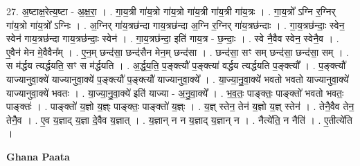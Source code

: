 \documentclass[17pt]{extarticle}
\begin{document}
27. अ॒ष्टाक्ष॒रेत्य॒ष्टा - अ॒क्ष॒रा॒ । . गा॒य॒त्री गा॑य॒त्रो गा॑य॒त्रो गा॑य॒त्री गा॑य॒त्री गा॑य॒त्रः । . गा॒य॒त्रो᳚ ऽग्नि र॒ग्निर् गा॑य॒त्रो गा॑य॒त्रो᳚ ऽग्निः । . अ॒ग्निर् गा॑य॒त्रछ॑न्दा गाय॒त्रछ॑न्दा अ॒ग्नि र॒ग्निर् गा॑य॒त्रछ॑न्दाः । . गा॒य॒त्रछ॑न्दाः॒ स्वेन॒ स्वेन॑ गाय॒त्रछ॑न्दा गाय॒त्रछ॑न्दाः॒ स्वेन॑ । . गा॒य॒त्रछ॑न्दा॒ इति॑ गाय॒त्र - छ॒न्दाः॒ । . स्वे नै॒वैव स्वेन॒ स्वेनै॒व । . ए॒वैन॑ मेन मे॒वैवैन᳚म् । . ए॒न॒म् छन्द॑सा॒ छन्द॑सैन मेन॒म् छन्द॑सा । . छन्द॑सा॒ सꣳ सम् छन्द॑सा॒ छन्द॑सा॒ सम् । . स म॑र्द्धय त्यर्द्धयति॒ सꣳ स म॑र्द्धयति । . अ॒र्द्ध॒य॒ति॒ प॒ङ्क्त्यौ॑ प॒ङ्क्त्या॑ वर्द्धय त्यर्द्धयति प॒ङ्क्त्यौ᳚ । . प॒ङ्क्त्यौ॑ याज्यानुवा॒क्ये॑ याज्यानुवा॒क्ये॑ प॒ङ्क्त्यौ॑ प॒ङ्क्त्यौ॑ याज्यानुवा॒क्ये᳚ । . या॒ज्या॒नु॒वा॒क्ये॑ भवतो भवतो याज्यानुवा॒क्ये॑ याज्यानुवा॒क्ये॑ भवतः । . या॒ज्या॒नु॒वा॒क्ये॑ इति॑ याज्या - अ॒नु॒वा॒क्ये᳚ । . भ॒व॒तः॒ पाङ्क्तः॒ पाङ्क्तो॑ भवतो भवतः॒ पाङ्क्तः॑ । . पाङ्क्तो॑ य॒ज्ञो य॒ज्ञ्ः पाङ्क्तः॒ पाङ्क्तो॑ य॒ज्ञ्ः । . य॒ज्ञ् स्तेन॒ तेन॑ य॒ज्ञो य॒ज्ञ् स्तेन॑ । . तेनै॒वैव तेन॒ तेनै॒व । . ए॒व य॒ज्ञाद् य॒ज्ञा दे॒वैव य॒ज्ञात् । . य॒ज्ञान् न न य॒ज्ञाद् य॒ज्ञान् न । . नैत्ये॑ति॒ न नैति॑ । . ए॒तीत्ये॑ति । \newline

\textbf{Ghana Paata } \newline
\end{document}

